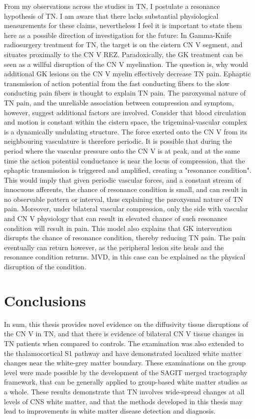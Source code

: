 From my observations across the studies in TN, I postulate a resonance hypothesis of TN. I am aware that there lacks substantial physiological measurements for these claims, nevertheless I feel it is important to state them here as a possible direction of investigation for the future: In Gamma-Knife radiosurgery treatment for TN, the target is on the cistern CN V segment, and situates proximally to the CN V REZ. Paradoxically, the GK treatment can be seen as a willful disruption of the CN V myelination. The question is, why would additional GK lesions on the CN V myelin effectively decrease TN pain. Ephaptic transmission of action potential from the fast conducting fibers to the slow conducting pain fibers is thought to explain TN pain. The paroxysmal nature of TN pain, and the unreliable association between compression and symptom, however, suggest additional factors are involved. Consider that blood circulation and motion is constant within the cistern space, the trigeminal-vascular complex is a dynamically undulating structure. The force exerted onto the CN V from its neighbouring vasculature is therefore periodic. It is possible that during the period where the vascular pressure onto the CN V is at peak, and at the same time the action potential conductance is near the locus of compression, that the ephaptic transmission is triggered and amplified, creating a "resonance condition". This would imply that given periodic vascular forces, and a constant stream of innocuous afferents, the chance of resonance condition is small, and can result in no observable pattern or interval, thus explaining the paroxysmal nature of TN pain. Moreover, under bilateral vascular compression, only the side with vascular and CN V physiology that can result in elevated chance of such resonance condition will result in pain. This model also explains that GK intervention disrupts the chance of resonance condition, thereby reducing TN pain. The pain eventually can return however, as the peripheral lesion site heals and the resonance condition returns. MVD, in this case can be explained as the physical disruption of the condition.

\section{Conclusions}

In sum, this thesis provides novel evidence on the diffusivity tissue disruptions of the CN V in TN, and that there is evidence of bilateral CN V tissue changes in TN patients when compared to controls. The examination was also extended to the thalamocortical S1 pathway and have demonstrated localized white matter changes near the white-grey matter boundary. These examinations on the group level were made possible by the development of the SAGIT merged tractography framework, that can be generally applied to group-based white matter studies as a whole. These results demonstrate that TN involves wide-spread changes at all levels of CNS white matter, and that the methods developed in this thesis may lead to improvements in white matter disease detection and diagnosis.